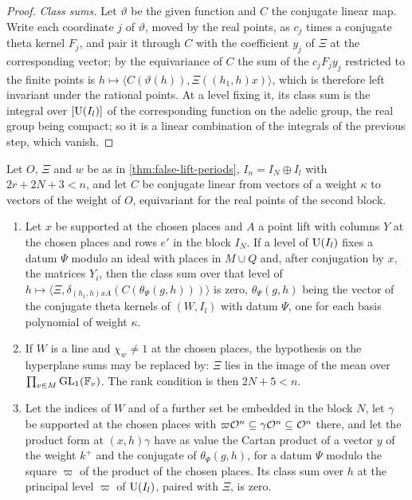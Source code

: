 \begin{proof}
\emph{Class sums.} Let $\vartheta$ be the given function and $C$ the conjugate linear map. Write each coordinate $j$ of $\vartheta$, moved by the real points, as $c_j$ times a conjugate theta kernel $F_j$, and pair it through
$C$ with the coefficient $y_j$ of $\Xi$ at the corresponding vector; by the equivariance of $C$ the sum of the $c_jF_jy_j$ restricted to the finite points is $h\mapsto\langle C(\vartheta(h)),\Xi((h_1,h)x)\rangle$, which is therefore left
invariant under the rational points. At a level fixing it, its class sum is the integral over $[\operatorname{U}(I_l)]$ of the corresponding function on the adelic group, the real group being compact; so it is a linear combination of the
integrals of the previous step, which vanish.
\end{proof}

\begin{corollary}\label{cor:false-lift-periods}
Let $O$, $\Xi$ and $w$ be as in \cref{thm:false-lift-periods}, $I_n=I_N\oplus I_l$ with $2r+2N+3<n$, and let $C$ be conjugate linear from vectors of a weight $\kappa$ to vectors of the weight of $O$, equivariant for the
real points of the second block.
\begin{enumerate}[label=\textup{(\alph*)}]
\item Let $x$ be supported at the chosen places and $A$ a point lift with columns $Y$ at the chosen places and rows $e'$ in the block $I_N$. If a level of $\operatorname{U}(I_l)$ fixes a datum $\Psi$ modulo an ideal with places in
$M\cup Q$ and, after conjugation by $x$, the matrices $Y_i$, then the class sum over that level of $h\mapsto\langle\Xi,\delta_{(h_1,h)xA}(C(\theta_\Psi(g,h)))\rangle$ is zero, $\theta_\Psi(g,h)$ being the vector of the conjugate theta kernels of
$(W,I_l)$ with datum $\Psi$, one for each basis polynomial of weight $\kappa$.
\item If $W$ is a line and $\chi_w\ne1$ at the chosen places, the hypothesis on the hyperplane sums may be replaced by: $\Xi$ lies in the image of the mean over $\prod_{v\in M}\operatorname{GL}_1(\mathbb{F}_v)$. The rank condition is then
$2N+5<n$.
\item Let the indices of $W$ and of a further set be embedded in the block $N$, let $\gamma$ be supported at the chosen places with $\varpi\mathcal{O}^n\subseteq\gamma\mathcal{O}^n\subseteq\mathcal{O}^n$ there, and let the product form at $(x,h)\gamma$ have as
value the Cartan product of a vector $y$ of the weight $k^+$ and the conjugate of $\theta_\Psi(g,h)$, for a datum $\Psi$ modulo the square $\varpi$ of the product of the chosen places. Its class sum over $h$ at the principal
level $\varpi$ of $\operatorname{U}(I_l)$, paired with $\Xi$, is zero.
\end{enumerate}
\end{corollary}

